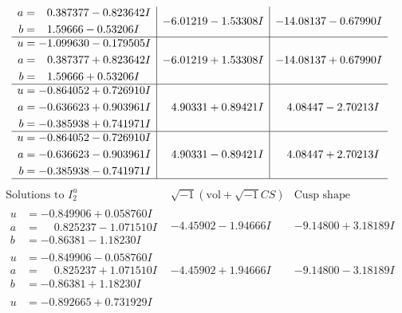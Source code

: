 \documentclass[1p]{elsarticle_modified}
\theoremstyle{definition}
\newcommand{\I}{\sqrt{-1}}
\begin{document}
$$\begin{array}{c|c|c}
\begin{aligned}
a &= \phantom{-}0.387377 - 0.823642 I \\
b &= \phantom{-}1.59666 - 0.53206 I\end{aligned}
 & -6.01219 - 1.53308 I & -14.08137 - 0.67990 I \\ \hline\begin{aligned}
u &= -1.099630 - 0.179505 I \\
a &= \phantom{-}0.387377 + 0.823642 I \\
b &= \phantom{-}1.59666 + 0.53206 I\end{aligned}
 & -6.01219 + 1.53308 I & -14.08137 + 0.67990 I \\ \hline\begin{aligned}
u &= -0.864052 + 0.726910 I \\
a &= -0.636623 + 0.903961 I \\
b &= -0.385938 + 0.741971 I\end{aligned}
 & \phantom{-}4.90331 + 0.89421 I & \phantom{-}4.08447 - 2.70213 I \\ \hline\begin{aligned}
u &= -0.864052 - 0.726910 I \\
a &= -0.636623 - 0.903961 I \\
b &= -0.385938 - 0.741971 I\end{aligned}
 & \phantom{-}4.90331 - 0.89421 I & \phantom{-}4.08447 + 2.70213 I\\
 \hline 
 \end{array}$$\newpage$$\begin{array}{c|c|c}  
\text{Solutions to }I^u_{2}& \I (\text{vol} + \sqrt{-1}CS) & \text{Cusp shape}\\
 \hline 
\begin{aligned}
u &= -0.849906 + 0.058760 I \\
a &= \phantom{-}0.825237 - 1.071510 I \\
b &= -0.86381 - 1.18230 I\end{aligned}
 & -4.45902 - 1.94666 I & -9.14800 + 3.18189 I \\ \hline\begin{aligned}
u &= -0.849906 - 0.058760 I \\
a &= \phantom{-}0.825237 + 1.071510 I \\
b &= -0.86381 + 1.18230 I\end{aligned}
 & -4.45902 + 1.94666 I & -9.14800 - 3.18189 I \\ \hline\begin{aligned}
u &= -0.892665 + 0.731929 I \\

\end{aligned}
\end{array}$$
\end{document}
